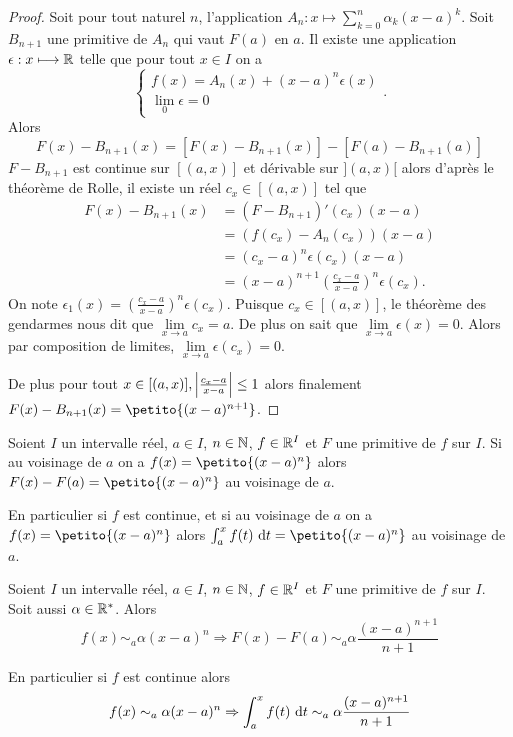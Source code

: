\begin{proof}
  Soit pour tout naturel $n$, l'application $A_n : x \longmapsto \sum_{k=0}^n \alpha_k(x-a)^k$. Soit $B_{n+1}$ une primitive de $A_n$ qui vaut $F(a)$ en $a$. Il existe une application $\epsilon: x \longmapsto \mathbb{R}$ telle que pour tout $x \in I$ on a
  \begin{equation}
    \begin{cases}
      f(x) = A_n(x)+(x-a)^n\epsilon(x) \\
      \lim\limits_{0} \epsilon = 0
    \end{cases}.
  \end{equation}
  Alors
  \begin{equation}
    F(x) - B_{n+1}(x) = [F(x)-B_{n+1}(x)] - [F(a)-B_{n+1}(a)]
  \end{equation}
  $F-B_{n+1}$ est continue sur $[(a,x)]$ et dérivable sur $](a,x)[$ alors d'après le théorème de Rolle, il existe un réel $c_x \in [(a,x)]$ tel que
  \begin{align}
    F(x)-B_{n+1}(x) &= (F-B_{n+1})'(c_x)(x-a)\\
    & = (f(c_x)-A_n(c_x))(x-a)\\
    &=(c_x-a)^n\epsilon(c_x)(x-a)\\
    &=(x-a)^{n+1} \left(\frac{c_x-a}{x-a}\right)^n \epsilon(c_x).
  \end{align}
  On note $\epsilon_1(x)=\left(\frac{c_x-a}{x-a}\right)^n \epsilon(c_x)$. Puisque $c_x \in [(a,x)]$, le théorème des gendarmes nous dit que $\lim\limits_{x \to a} c_x =a$. De plus on sait que $\lim\limits_{x \to a}\epsilon(x)=0$. Alors par composition de limites, $\lim\limits_{x \to a} \epsilon(c_x)=0$. 

De plus pour tout $x \in [(a,x)], \left\lvert\frac{c_x-a}{x-a}\right\rvert \leq 1$ alors finalement $F(x)-B_{n+1}(x) = \petito{(x-a)^{n+1}}$.
\end{proof}

\begin{corth}
  Soient $I$ un intervalle réel, $a \in I$, $n \in \mathbb{N}$, $f \in \mathbb{R}^I$ et $F$ une primitive de $f$ sur $I$. Si au voisinage de $a$ on a $f(x)=\petito{(x-a)^n}$ alors $F(x)-F(a)=\petito{(x-a)^n}$ au voisinage de $a$. 

  En particulier si $f$ est continue, et si au voisinage de $a$ on a  $f(x)=\petito{(x-a)^n}$ alors $\int_a^x f(t)\,\diff t=\petito{(x-a)^n}$ au voisinage de $a$. 
\end{corth}

\begin{corth}
  Soient $I$ un intervalle réel, $a \in I$, $n \in \mathbb{N}$, $f \in \mathbb{R}^I$ et $F$ une primitive de $f$ sur $I$. Soit aussi $\alpha \in \mathbb{R}^{*}$. Alors
  \begin{equation}
    f(x) \sim_a \alpha(x-a)^n \Rightarrow F(x)-F(a) \sim_a \alpha \frac{(x-a)^{n+1}}{n+1}
  \end{equation}

  En particulier si $f$ est continue alors
  \begin{equation}
    f(x) \sim_a \alpha(x-a)^n \Rightarrow \int_a^x f(t)\,\mathop{}\mathopen{}\mathrm{d} t \sim_a \alpha \frac{(x-a)^{n+1}}{n+1}
  \end{equation}
\end{corth}

